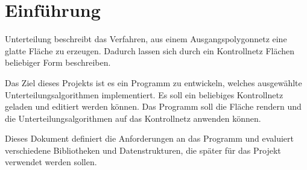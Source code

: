 \chapter{Einführung}

Unterteilung beschreibt das Verfahren, aus einem Ausgangspolygonnetz eine glatte Fläche zu erzeugen.
Dadurch lassen sich durch ein Kontrollnetz Flächen beliebiger Form beschreiben.

Das Ziel dieses Projekts ist es ein Programm zu entwickeln, welches ausgewählte Unterteilungsalgorithmen implementiert.
Es soll ein beliebiges Kontrollnetz geladen und editiert werden können.
Das Programm soll die Fläche rendern und die Unterteilungsalgorithmen auf das Kontrollnetz anwenden können.

Dieses Dokument definiert die Anforderungen an das Programm und evaluiert verschiedene Bibliotheken und Datenstrukturen, die später für das Projekt verwendet werden sollen.